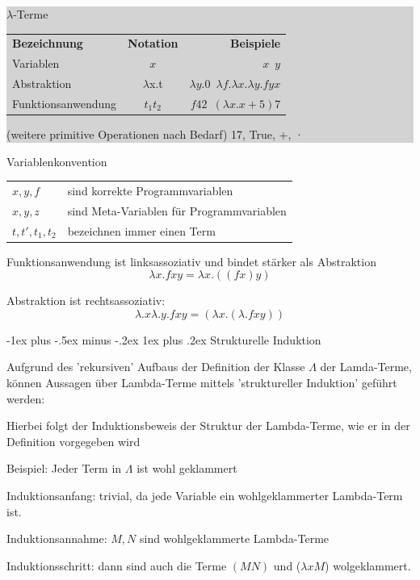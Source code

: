 \documentclass[10pt]{article}
\makeatletter
\renewcommand{\subsubsection}{\@startsection{subsubsection}{3}{0mm}%
                                {-1ex plus -.5ex minus -.2ex}%
                                {1ex plus .2ex}%
                                {\normalfont\small\bfseries}}
\makeatother
\begin{document}
\subitem\colorbox{lightgray}{
  \begin{minipage}[h]{0.9\linewidth}
    $\lambda$-Terme\\
    \begin{tabular}[h]{lcr}
      \textbf {Bezeichnung} & \textbf{Notation} & \textbf{Beispiele}                                         \\
      Variablen             & $x$               & $x \enspace y$                                             \\
      Abstraktion           & $\lambda$x.t      & $\lambda y.0 \enspace \lambda f. \lambda x. \lambda y.fyx$ \\
      Funktionsanwendung    & $t_1t_2$          & $f 42 \enspace ( \lambda x.x+5)7$
    \end{tabular}

    (weitere primitive Operationen nach Bedarf) 17, True, +, ·		
  \end{minipage}
}

Variablenkonvention
\begin{tabular}[h]{l l}
  $x ,y ,f$         & \enspace  sind korrekte Programmvariablen           \\
  $x, y, z$         & \enspace  sind Meta-Variablen für Programmvariablen \\
  $t, t', t_1, t_2$ & \enspace  bezeichnen immer einen Term
\end{tabular}

Funktionsanwendung ist linksassoziativ und bindet stärker als Abstraktion
$$\lambda x.fxy = \lambda x.((fx)y)$$

Abstraktion ist rechtsassoziativ: 
$$\lambda.x\lambda.y.fxy = (\lambda x.( \lambda.fxy))$$

\subsubsection{Strukturelle Induktion}
\begin{itemize*}
  \item Aufgrund des 'rekursiven' Aufbaus der Definition der Klasse $\Lambda$ der Lamda-Terme, können Aussagen über Lambda-Terme mittels \color{blue} 'struktureller Induktion' \color{black} geführt werden:
  \begin{itemize*}
    \item Hierbei folgt der Induktionsbeweis der Struktur der Lambda-Terme, wie er in der Definition vorgegeben wird
  \end{itemize*}
  \item Beispiel: Jeder Term in $\Lambda$ ist wohl geklammert
  \begin{itemize*}
    \item \color{blue}Induktionsanfang: \color{black} trivial, da jede Variable ein wohlgeklammerter Lambda-Term ist.
    \item \color{blue} Induktionsannahme: \color{black} $M,N$ sind wohlgeklammerte Lambda-Terme
    \item \color{blue} Induktionsschritt: \color{black} dann sind auch die Terme $(MN)$ und ($\lambda xM$) wolgeklammert.
  \end{itemize*}
\end{itemize*}
\end{document}
